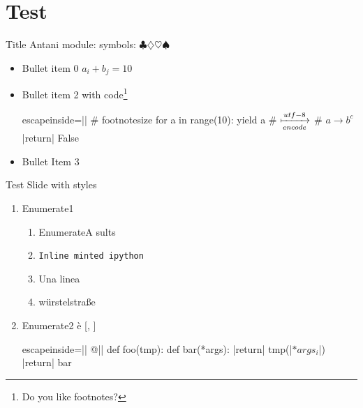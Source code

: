 \section{Test}
\usepackage{pdfcomment}

\begin{pyframe}{Title}
Antani
module: 
symbols: $\clubsuit \diamondsuit \heartsuit \spadesuit$
\end{pyframe}

\begin{pyframe}{}
\begin{itemize}
\item Bullet  item 0 $a_i + b_j = 10 $
\item Bullet  item 2 with code\footnote{Do you like footnotes?}
\begin{pycode*}{escapeinside=||}
    # footnotesize
    for  a in range(10):
        yield a
    # $\xmapsto[encode]{utf-8}$
    # $a \rightarrow b^{c}$
    |return| False
\end{pycode*}
\item Bullet Item 3 
\end{itemize}
\end{pyframe}

\begin{pyframe}{Test Slide with styles}
\begin{enumerate}
\item Enumerate1  
    \begin{enumerate}
    \item EnumerateA  sults
    \item \texttt{Inline minted ipython}
    \item Una linea 
    \item w\"urstelstra\ss e
    \end{enumerate}

\item Enumerate2 \`{e} 
 [, ] 
\begin{pycode*}{escapeinside=||}
@||
def foo(tmp):
    def bar(*args):
        |return| tmp(|$*args_{i}$|)
    |return| bar
\end{pycode*}

\end{enumerate}

\end{pyframe}

